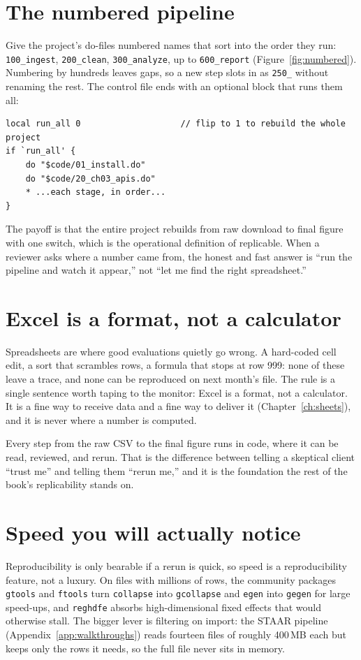 \documentclass[
    a4paper,
    fontsize=10pt,
    twoside=true,
    numbers=noenddot,
]{kaobook}
\begin{document}
\section{The numbered pipeline}
Give the project's do-files numbered names that sort into the order they run: \texttt{100\_ingest}, \texttt{200\_clean}, \texttt{300\_analyze}, up to \texttt{600\_report} (Figure~\ref{fig:numbered}). Numbering by hundreds leaves gaps, so a new step slots in as \texttt{250\_} without renaming the rest. The control file ends with an optional block that runs them all:
{\footnotesize
\begin{verbatim}
local run_all 0                    // flip to 1 to rebuild the whole project
if `run_all' {
    do "$code/01_install.do"
    do "$code/20_ch03_apis.do"
    * ...each stage, in order...
}
\end{verbatim}
}
The payoff is that the entire project rebuilds from raw download to final figure with one switch, which is the operational definition of replicable. When a reviewer asks where a number came from, the honest and fast answer is \enquote{run the pipeline and watch it appear,} not \enquote{let me find the right spreadsheet.}

\section{Excel is a format, not a calculator}
Spreadsheets are where good evaluations quietly go wrong. A hard-coded cell edit, a sort that scrambles rows, a formula that stops at row 999: none of these leave a trace, and none can be reproduced on next month's file. The rule is a single sentence worth taping to the monitor: Excel is a format, not a calculator. It is a fine way to receive data and a fine way to deliver it (Chapter~\ref{ch:sheets}), and it is never where a number is computed.

Every step from the raw CSV to the final figure runs in code, where it can be read, reviewed, and rerun. That is the difference between telling a skeptical client \enquote{trust me} and telling them \enquote{rerun me,} and it is the foundation the rest of the book's replicability stands on.

\section{Speed you will actually notice}
Reproducibility is only bearable if a rerun is quick, so speed is a reproducibility feature, not a luxury. On files with millions of rows, the community packages \texttt{gtools} and \texttt{ftools} turn \texttt{collapse} into \texttt{gcollapse} and \texttt{egen} into \texttt{gegen} for large speed-ups, and \texttt{reghdfe} absorbs high-dimensional fixed effects that would otherwise stall. The bigger lever is filtering on import: the STAAR pipeline (Appendix~\ref{app:walkthroughs}) reads fourteen files of roughly 400\,MB each but keeps only the rows it needs, so the full file never sits in memory.
\end{document}
